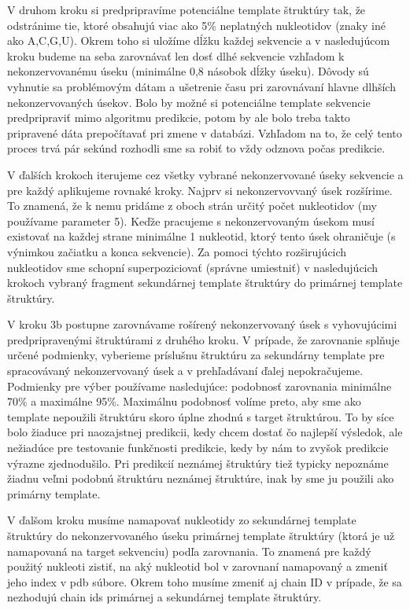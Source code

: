 \indent V druhom kroku si predpripravíme potenciálne template štruktúry tak, že odstránime tie, ktoré obsahujú viac ako 5\% neplatných nukleotidov (znaky iné ako A,C,G,U). Okrem toho si uložíme dĺžku každej sekvencie a v nasledujúcom kroku budeme na seba zarovnávať len dosť dlhé sekvencie vzhľadom k nekonzervovanému úseku (minimálne 0,8 násobok dĺžky úseku). Dôvody sú vyhnutie sa problémovým dátam a ušetrenie času pri zarovnávaní hlavne dlhších nekonzervovaných úsekov. Bolo by možné si potenciálne template sekvencie predpripraviť mimo algoritmu predikcie, potom by ale bolo treba takto pripravené dáta prepočítavať pri zmene v databázi. Vzhľadom na to, že celý tento proces trvá pár sekúnd rozhodli sme sa robiť to vždy odznova počas predikcie.


\indent V ďalších krokoch iterujeme cez všetky vybrané nekonzervované úseky sekvencie a pre každý aplikujeme rovnaké kroky. Najprv si nekonzervovvaný úsek rozšírime. To znamená, že k nemu pridáme z oboch strán určitý počet nukleotidov (my používame parameter 5). Keďže pracujeme s nekonzervovaným úsekom musí existovať na každej strane minimálne 1 nukleotid, ktorý tento úsek ohraničuje (s výnimkou začiatku a konca sekvencie). Za pomoci týchto rozširujúcich nukleotidov sme schopní superpoziciovať (správne umiestniť) v nasledujúcich krokoch vybraný fragment sekundárnej template štruktúry do primárnej template štruktúry.


\indent V  kroku 3b postupne zarovnávame rošírený nekonzervovaný úsek s vyhovujúcimi predpripravenými štruktúrami z druhého kroku. V prípade, že zarovnanie splňuje určené podmienky, vyberieme príslušnu štruktúru za sekundárny template  pre spracovávaný nekonzervovaný úsek a v prehľadávaní ďalej nepokračujeme. Podmienky pre výber používame nasledujúce: podobnosť zarovnania minimálne 70\% a maximálne 95\%. Maximálnu podobnosť volíme preto, aby sme ako template nepoužili štruktúru skoro úplne zhodnú s target štruktúrou. To by síce bolo žiaduce pri naozajstnej predikcii, kedy chcem dostať čo najlepší výsledok, ale nežiadúce pre testovanie funkčnosti predikcie, kedy by nám to zvyšok predikcie výrazne zjednodušilo. Pri predikcií neznámej štruktúry tiež typicky nepoznáme žiadnu veľmi podobnú štruktúru neznámej štruktúre, inak by sme ju použili ako primárny template. 


\indent V ďalšom kroku musíme namapovať nukleotidy zo sekundárnej template štruktúry do nekonzervovaného úseku primárnej template štruktúry (ktorá je už namapovaná na target sekvenciu) podľa zarovnania. To znamená pre každý použitý nukleoti zistiť, na aký nukleotid bol v zarovnaní namapovaný a zmeniť jeho index v pdb súbore. Okrem toho musíme zmeniť aj chain ID v prípade, že sa nezhodujú chain ids primárnej a sekundárnej template štruktúry.


